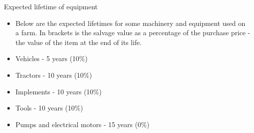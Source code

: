 \documentclass[12pt,ignorenonframetext,aspectratio=169]{beamer}
\begin{document}
\begin{frame}{Expected lifetime of equipment}
\protect\hypertarget{expected-lifetime-of-equipment}{}
\begin{itemize}
\item
  Below are the expected lifetimes for some machinery and equipment used
  on a farm. In brackets is the salvage value as a percentage of the
  purchase price - the value of the item at the end of its life.
\item
  Vehicles - 5 years (10\%)
\item
  Tractors - 10 years (10\%)
\item
  Implements - 10 years (10\%)
\item
  Tools - 10 years (10\%)
\item
  Pumps and electrical motors - 15 years (0\%)
\end{itemize}
\end{frame}
\end{document}
